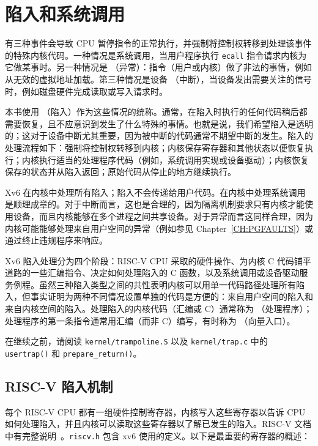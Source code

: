 \chapter{陷入和系统调用}
\label{CH:TRAP}

有三种事件会导致 CPU 暂停指令的正常执行，并强制将控制权转移到处理该事件的特殊内核代码。一种情况是系统调用，当用户程序执行 {\tt ecall} 指令请求内核为它做某事时。另一种情况是 （异常）：指令（用户或内核）做了非法的事情，例如从无效的虚拟地址加载。第三种情况是设备 （中断），当设备发出需要关注的信号时，例如磁盘硬件完成读取或写入请求时。

本书使用 （陷入）作为这些情况的统称。通常，在陷入时执行的任何代码稍后都需要恢复，且不应意识到发生了什么特殊的事情。也就是说，我们希望陷入是透明的；这对于设备中断尤其重要，因为被中断的代码通常不期望中断的发生。陷入的处理流程如下：强制将控制权转移到内核；内核保存寄存器和其他状态以便恢复执行；内核执行适当的处理程序代码（例如，系统调用实现或设备驱动）；内核恢复保存的状态并从陷入返回；原始代码从停止的地方继续执行。

Xv6 在内核中处理所有陷入；陷入不会传递给用户代码。在内核中处理系统调用是顺理成章的。对于中断而言，这也是合理的，因为隔离机制要求只有内核才能使用设备，而且内核能够在多个进程之间共享设备。对于异常而言这同样合理，因为内核可能能够处理来自用户空间的异常（例如参见 Chapter~\ref{CH:PGFAULTS}）或通过终止违规程序来响应。

Xv6 陷入处理分为四个阶段：RISC-V CPU 采取的硬件操作、为内核 C 代码铺平道路的一些汇编指令、决定如何处理陷入的 C 函数，以及系统调用或设备驱动服务例程。虽然三种陷入类型之间的共性表明内核可以用单一代码路径处理所有陷入，但事实证明为两种不同情况设置单独的代码是方便的：来自用户空间的陷入和来自内核空间的陷入。处理陷入的内核代码（汇编或 C）通常称为 （处理程序）；处理程序的第一条指令通常用汇编（而非 C）编写，有时称为 （向量入口）。

在继续之前，请阅读 {\tt kernel/trampoline.S} 以及 {\tt kernel/trap.c} 中的 {\tt usertrap()} 和 {\tt prepare\_return()}。

\section{RISC-V 陷入机制}

每个 RISC-V CPU 都有一组硬件控制寄存器，内核写入这些寄存器以告诉 CPU 如何处理陷入，并且内核可以读取这些寄存器以了解已发生的陷入。RISC-V 文档中有完整说明~\cite{riscv:priv}。{\tt riscv.h}
包含 xv6 使用的定义。以下是最重要的寄存器的概述：

